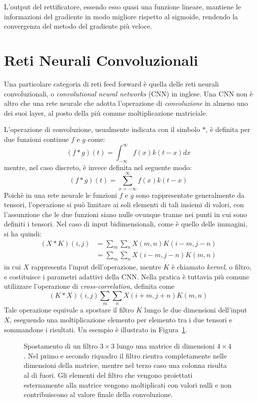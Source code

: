 L'output del rettificatore, essendo esso quasi una funzione lineare, mantiene
le informazioni del gradiente in modo migliore rispetto al sigmoide,
rendendo la convergenza del metodo del gradiente più veloce.
\section{Reti Neurali Convoluzionali}
Una particolare categoria di reti feed forward è quella delle reti neurali
convoluzionali, o \emph{convolutional neural networks} (CNN) in inglese. Una
CNN non è altro che una rete neurale che adotta l'operazione di
\emph{convoluzione} in almeno uno dei suoi layer, al posto della più comune
moltiplicazione matriciale.

L'operazione di convoluzione, usualmente indicata con il simbolo $*$, è
definita per due funzioni continue $f$ e $g$ come:
\[
(f * g)(t) = \int_{-\infty}^\infty{f(x)k(t - x)dx}
\]
mentre, nel caso discreto, è invece definita nel seguente modo:
\[
(f * g)(t) = \sum_{x = -\infty}^\infty{f(x)k(t - x)}
\]
Poichè in una rete neurale le funzioni $f$ e $g$ sono rappresentate
generalmente da tensori, l'operazione si può limitare ai soli elementi di tali
insiemi di valori, con l'assunzione che le due funzioni siano nulle ovunque
tranne nei punti in cui sono definiti i tensori. Nel caso di input
bidimensionali, come è quello delle immagini, si ha quindi:
\begin{align*}
(X * K)(i,j) &= \sum_m{\sum_n{X(m,n) K(i - m, j - n)}} \\
             &= \sum_m{\sum_n{X(i - m, j - n) K(m, n)}}
\end{align*}
in cui $X$ rappresenta l'input dell'operazione, mentre $K$ è chiamato
\emph{kernel}, o filtro, e costituisce i parametri adattivi della CNN\@. Nella
pratica è tuttavia più comune utilizzare l'operazione di
\emph{cross-correlation}, definita come
\[ (K * X)(i, j) \sum_m{\sum_n{X(i + m, j + n) K(m, n)}} \]
Tale operazione equivale a spostare il filtro $K$ lungo le due dimensioni
dell'input $X$, eseguendo una moltiplicazione elemento per elemento tra i due
tensori e sommandone i risultati. Un esempio è illustrato in
Figura~\ref{fig:conv}.
\begin{figure}[htp]
  \caption{%
    Spostamento di un filtro $3\times3$ lungo una matrice di dimensioni
    $4\times4$. Nel primo e secondo riquadro il filtro rientra completamente
    nelle dimensioni della matrice, mentre nel terzo caso una colonna risulta
    al di fuori. Gli elementi del filtro che vengono proiettati esternamente
    alla matrice vengono moltiplicati con valori nulli e non contribuiscono al
    valore finale della convoluzione.
  }%
  \label{fig:conv}
\end{figure}
